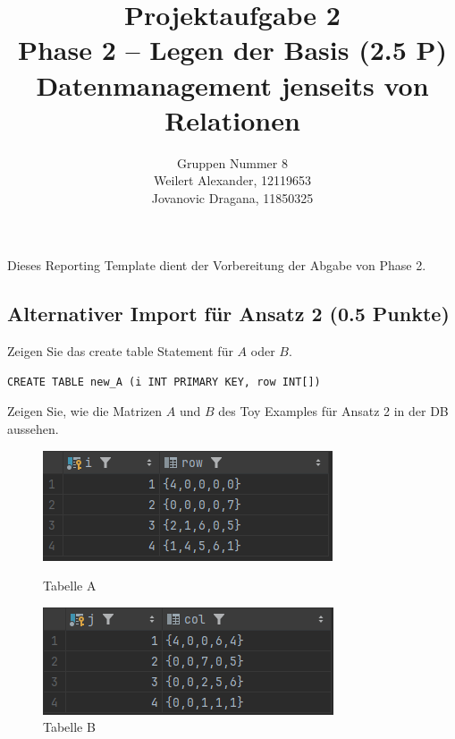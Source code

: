 \documentclass[11pt]{scrartcl}
\title{
  \textbf{\large Projektaufgabe 2 } \\
  Phase 2 – Legen der Basis (2.5 P) \\
  {\large Datenmanagement jenseits von Relationen}
}
\author{
  Gruppen Nummer 8 \\
  \large Weilert Alexander, 12119653 \\
  \large Jovanovic Dragana, 11850325
}
\begin{document}
\maketitle\thispagestyle{empty}

Dieses Reporting Template dient der Vorbereitung der Abgabe von Phase 2.

\subsection*{Alternativer Import für Ansatz 2 (0.5 Punkte)}

Zeigen Sie das create table Statement für $A$ oder $B$. 

\begin{lstlisting}[style=dmrsql]
  CREATE TABLE new_A (i INT PRIMARY KEY, row INT[])
\end{lstlisting}

Zeigen Sie, wie die Matrizen $A$ und $B$ des Toy Examples für Ansatz 2 in der DB aussehen.

\begin{figure}[H]
  \begin{minipage}[b]{.4\linewidth}
    \begin{center}
      \includegraphics[width=\linewidth]{Tabelle_new_A.png}
      \caption{Tabelle A}
    \end{center}
  \end{minipage}
  \hspace{.1\linewidth}
  \begin{minipage}[b]{.4\linewidth}
    \begin{center}
      \includegraphics[width=\linewidth]{Tabelle_new_B.png}
      \caption{Tabelle B}
    \end{center}
  \end{minipage}
\end{figure}
\end{document}
